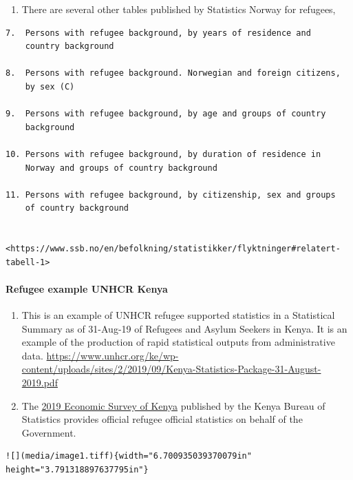 \documentclass[
]{article}
\providecommand{\tightlist}{%
  \setlength{\itemsep}{0pt}\setlength{\parskip}{0pt}}
\begin{document}
\begin{enumerate}
\def\labelenumi{\arabic{enumi}.}
\setcounter{enumi}{412}
\tightlist
\item
  There are several other tables published by Statistics Norway for
  refugees,
\end{enumerate}

\begin{verbatim}
7.  Persons with refugee background, by years of residence and
    country background

8.  Persons with refugee background. Norwegian and foreign citizens,
    by sex (C)

9.  Persons with refugee background, by age and groups of country
    background

10. Persons with refugee background, by duration of residence in
    Norway and groups of country background

11. Persons with refugee background, by citizenship, sex and groups
    of country background

    <https://www.ssb.no/en/befolkning/statistikker/flyktninger#relatert-tabell-1>
\end{verbatim}

\hypertarget{refugee-example-unhcr-kenya}{%
\paragraph{Refugee example UNHCR Kenya}\label{refugee-example-unhcr-kenya}}

\begin{enumerate}
\def\labelenumi{\arabic{enumi}.}
\setcounter{enumi}{413}
\item
  This is an example of UNHCR refugee supported statistics in a
  Statistical Summary as of 31-Aug-19 of Refugees and Asylum Seekers
  in Kenya. It is an example of the production of rapid statistical
  outputs from administrative data.
  \url{https://www.unhcr.org/ke/wp-content/uploads/sites/2/2019/09/Kenya-Statistics-Package-31-August-2019.pdf}
\item
  The \href{https://africaopendata.org/dataset/kenya-economic-survey-2019/resource/5b9357a4-6227-4fbf-9e10-ae7043a41ce3}{2019 Economic Survey of
  Kenya}
  published by the Kenya Bureau of Statistics provides official
  refugee official statistics on behalf of the Government.
\end{enumerate}

\begin{verbatim}
![](media/image1.tiff){width="6.700935039370079in"
height="3.791318897637795in"}
\end{verbatim}
\end{document}
